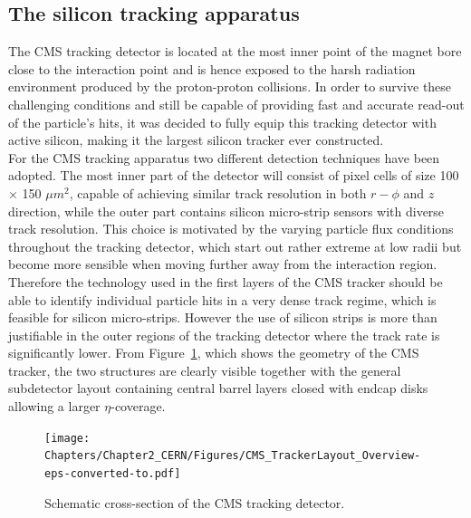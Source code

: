 \subsection{The silicon tracking apparatus}\label{sec::Tracker}
The CMS tracking detector is located at the most inner point of the magnet bore close to the interaction point and is hence exposed to the harsh radiation environment produced by the proton-proton collisions. In order to survive these challenging conditions and still be capable of providing fast and accurate read-out of the particle's hits, it was decided to fully equip this tracking detector with active silicon, making it the largest silicon tracker ever constructed.
\\
For the CMS tracking apparatus two different detection techniques have been adopted.
The most inner part of the detector will consist of pixel cells of size 100 $\times$ 150 $\unit{\mu m}^{2}$, capable of achieving similar track resolution in both $r-\phi$ and $z$ direction, while the outer part contains silicon micro-strip sensors with diverse track resolution. 
This choice is motivated by the varying particle flux conditions throughout the tracking detector, which start out rather extreme at low radii but become more sensible when moving further away from the interaction region. 
Therefore the technology used in the first layers of the CMS tracker should be able to identify individual particle hits in a very dense track regime, which is feasible for silicon micro-strips. However the use of silicon strips is more than justifiable in the outer regions of the tracking detector where the track rate is significantly lower.
From Figure~\ref{fig::CMSTracker}, which shows the geometry of the CMS tracker, the two structures are clearly visible together with the general subdetector layout containing central barrel layers closed with endcap disks allowing a larger $\eta$-coverage.
\begin{figure}[h!t]
 \centering
 \texttt{[image: Chapters/Chapter2\_CERN/Figures/CMS\_TrackerLayout\_Overview-eps-converted-to.pdf]}
 \caption{Schematic cross-section of the CMS tracking detector.} \label{fig::CMSTracker}
\end{figure}

